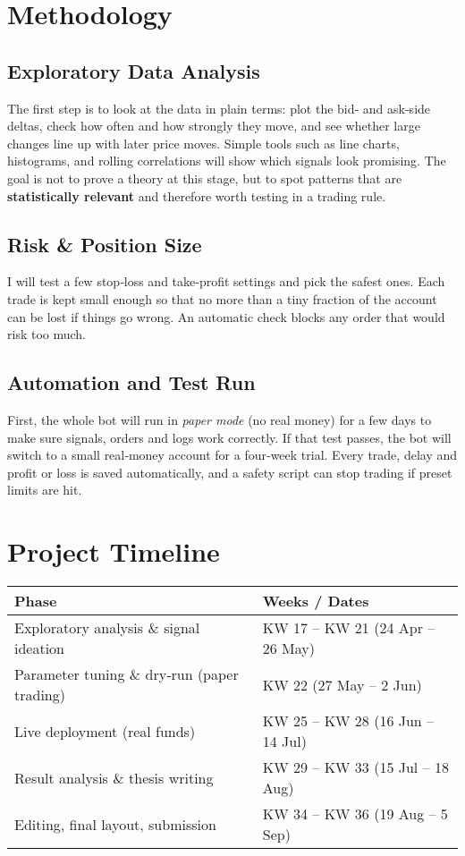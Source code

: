\documentclass[a4paper,12pt]{article}
\begin{document}
\section{Methodology}

\subsection{Exploratory Data Analysis}

The first step is to look at the data in plain terms: plot the bid‑ and
ask‑side deltas, check how often and how strongly they move, and see
whether large changes line up with later price moves.  Simple tools
such as line charts, histograms, and rolling correlations will show
which signals look promising.  The goal is not to prove a theory at
this stage, but to spot patterns that are \textbf{statistically
relevant} and therefore worth testing in a trading rule.



\subsection{Risk \& Position Size}

I will test a few stop‑loss and take‑profit settings and pick the safest
ones.  Each trade is kept small enough so that no more than a tiny
fraction of the account can be lost if things go wrong.  An automatic
check blocks any order that would risk too much.

\subsection{Automation and Test Run}

First, the whole bot will run in \emph{paper mode} (no real money) for a
few days to make sure signals, orders and logs work correctly.  If that
test passes, the bot will switch to a small real‑money account for a
four‑week trial.  Every trade, delay and profit or loss is saved
automatically, and a safety script can stop trading if preset limits are
hit.


\section{Project Timeline}

\begin{tabular}{ll}
\toprule
\textbf{Phase} & \textbf{Weeks / Dates} \\
\midrule
Exploratory analysis \& signal ideation      & KW 17 – KW 21 (24 Apr – 26 May) \\
Parameter tuning \& dry‑run (paper trading)  & KW 22 (27 May – 2 Jun) \\
Live deployment (real funds)                 & KW 25 – KW 28 (16 Jun – 14 Jul) \\
Result analysis \& thesis writing           & KW 29 – KW 33 (15 Jul – 18 Aug) \\
Editing, final layout, submission           & KW 34 – KW 36 (19 Aug – 5 Sep) \\
\bottomrule
\end{tabular}
\end{document}
